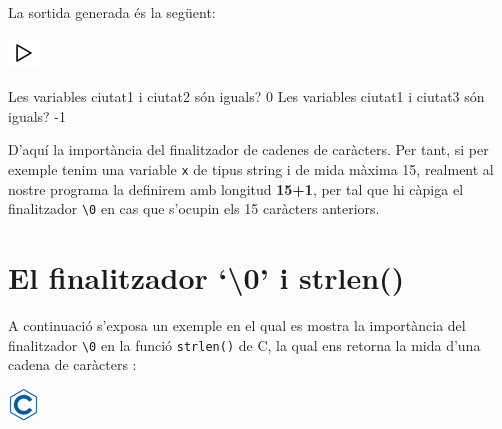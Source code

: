 \documentclass[
]{book}
\newenvironment{Shaded}{\begin{snugshade}}{\end{snugshade}}
\newcommand{\DecValTok}[1]{\textcolor[rgb]{0.00,0.00,0.81}{#1}}
\newcommand{\NormalTok}[1]{#1}
\begin{document}
La sortida generada és la següent:

\includegraphics{./img/play.png}

\begin{Shaded}
\begin{Highlighting}[]
\NormalTok{Les variables ciutat1 i ciutat2 són iguals? }\DecValTok{0}
\NormalTok{Les variables ciutat1 i ciutat3 són iguals? {-}}\DecValTok{1}
\end{Highlighting}
\end{Shaded}

D'aquí la importància del finalitzador de cadenes de caràcters. Per tant, si per exemple tenim una variable \texttt{x} de tipus string i de mida màxima 15, realment al nostre programa la definirem amb longitud \textbf{15+1}, per tal que hi càpiga el finalitzador \texttt{\textquotesingle{}\textbackslash{}0\textquotesingle{}} en cas que s'ocupin els 15 caràcters anteriors.

\hypertarget{el-finalitzador-0-i-strlen}{%
\section{El finalitzador `\textbackslash0' i strlen()}\label{el-finalitzador-0-i-strlen}}

A continuació s'exposa un exemple en el qual es mostra la importància del finalitzador \texttt{\textquotesingle{}\textbackslash{}0\textquotesingle{}} en la funció \texttt{strlen()} de C, la qual ens retorna la mida d'una cadena de caràcters :

\includegraphics{./img/c.png}
\end{document}
